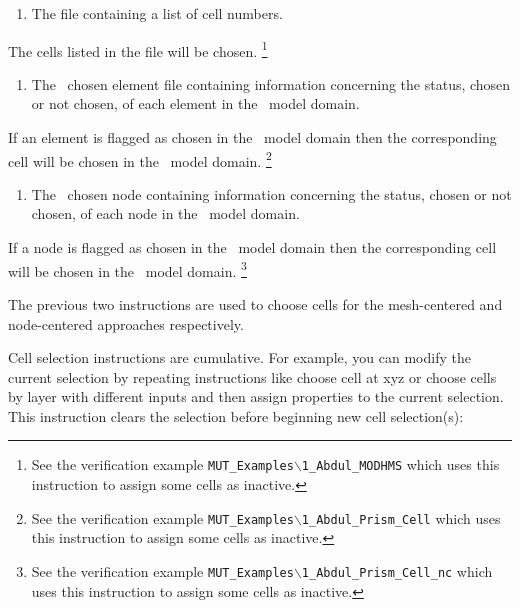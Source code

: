 {
    {
        \squish
        \begin{enumerate}
        \item {}  The file  containing a list of cell numbers.
        \end{enumerate}
        The cells listed in the file  will be chosen.  \footnote{ See the verification example \texttt{MUT\_Examples$\backslash$1\_Abdul\_MODHMS} which uses this instruction to assign some cells as inactive.}
    }

\pagebreak
{}
    {
        \squish
        \begin{enumerate}
        \item {}  The \gb\ chosen element file  containing information concerning the status, chosen or not chosen, of each element in the \gb\ model domain.
        \end{enumerate}
          If an element is flagged as chosen in the \gb\ model domain then the corresponding cell will be chosen in the \mfus\ model domain.  \footnote{ See the verification example \texttt{MUT\_Examples$\backslash$1\_Abdul\_Prism\_Cell} which uses this instruction to assign some cells as inactive.}
    }

    {
        \squish
        \begin{enumerate}
        \item {}  The \gb\ chosen node  containing information concerning the status, chosen or not chosen, of each node in the \gb\ model domain.
        \end{enumerate}
          If a node is flagged as chosen in the \gb\ model domain then the corresponding cell will be chosen in the \mfus\ model domain.  \footnote{ See the verification example \texttt{MUT\_Examples$\backslash$1\_Abdul\_Prism\_Cell\_nc} which uses this instruction to assign some cells as inactive.}
    }

The previous two instructions are used to choose cells for the mesh-centered and node-centered approaches respectively.

Cell selection instructions are cumulative.  For example, you can modify the current selection by repeating instructions like  \textsf{choose cell at xyz} or \textsf{choose cells by layer} with different inputs and then assign properties to the current selection.  This instruction clears the selection before beginning new cell selection(s):

}
